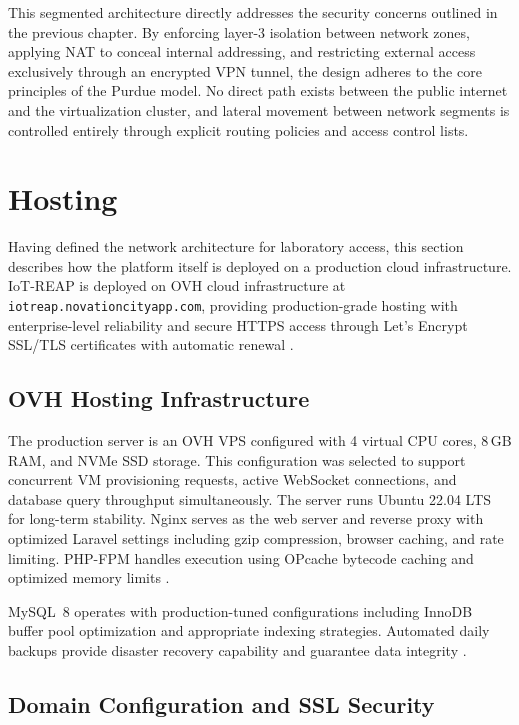 This segmented architecture directly addresses the security concerns outlined
in the previous chapter. By enforcing layer-3 isolation between network zones,
applying NAT to conceal internal addressing, and restricting external access
exclusively through an encrypted VPN tunnel, the design adheres to the core
principles of the Purdue model. No direct path exists between the public
internet and the virtualization cluster, and lateral movement between network
segments is controlled entirely through explicit routing policies and access
control lists.

\section{Hosting}
\label{sec:hosting}

Having defined the network architecture for laboratory access, this section
describes how the platform itself is deployed on a production cloud
infrastructure. IoT-REAP is deployed on OVH cloud infrastructure at
\texttt{iotreap.novationcityapp.com}, providing production-grade hosting with
enterprise-level reliability and secure HTTPS access through Let's Encrypt
SSL/TLS certificates with automatic renewal
  {\footnotesize\cite{ovh-vps-docs,letsencrypt-docs}}.

\subsection{OVH Hosting Infrastructure}

The production server is an OVH VPS configured with 4 virtual CPU cores, 8\,GB
RAM, and NVMe SSD storage. This configuration was selected to support
concurrent VM provisioning requests, active WebSocket connections, and database
query throughput simultaneously. The server runs Ubuntu 22.04 LTS for long-term
stability. Nginx serves as the web server and reverse proxy with optimized
Laravel settings including gzip compression, browser caching, and rate
limiting. PHP-FPM handles execution using OPcache bytecode caching and
optimized memory limits {\footnotesize\cite{ubuntu-docs,nginx-docs,php-docs}}.

MySQL~8 operates with production-tuned configurations including InnoDB buffer
pool optimization and appropriate indexing strategies. Automated daily backups
provide disaster recovery capability and guarantee data integrity
  {\footnotesize\cite{mysql-docs}}.

\subsection{Domain Configuration and SSL Security}

